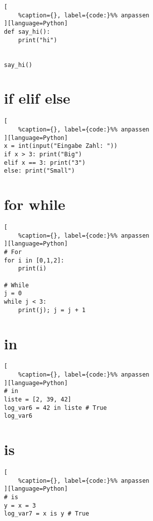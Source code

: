 \lstset{language=Python}%
\begin{lstlisting}[
	%caption={}, label={code:}%% anpassen
][language=Python]
def say_hi():
    print("hi")


say_hi()
\end{lstlisting}

\section{if elif else}\label{if-elif-else}

\lstset{language=Python}%
\begin{lstlisting}[
	%caption={}, label={code:}%% anpassen
][language=Python]
x = int(input("Eingabe Zahl: "))
if x > 3: print("Big")
elif x == 3: print("3")
else: print("Small")
\end{lstlisting}

\section{for while}\label{for-while}

\lstset{language=Python}%
\begin{lstlisting}[
	%caption={}, label={code:}%% anpassen
][language=Python]
# For 
for i in [0,1,2]:
    print(i)

# While 
j = 0
while j < 3:
    print(j); j = j + 1
\end{lstlisting}

\section{in}\label{in}

\lstset{language=Python}%
\begin{lstlisting}[
	%caption={}, label={code:}%% anpassen
][language=Python]
# in
liste = [2, 39, 42]
log_var6 = 42 in liste # True
log_var6
\end{lstlisting}

\section{is}\label{is}

\lstset{language=Python}%
\begin{lstlisting}[
	%caption={}, label={code:}%% anpassen
][language=Python]
# is
y = x = 3
log_var7 = x is y # True
\end{lstlisting}

